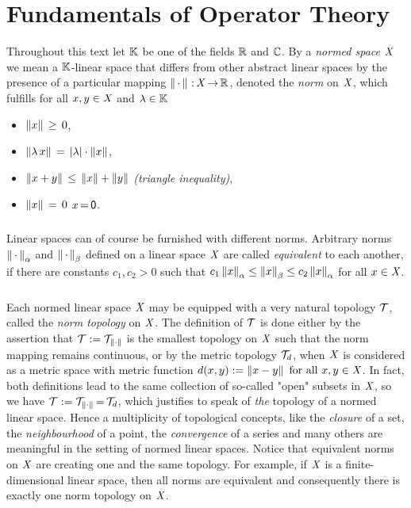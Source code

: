 \documentclass[11pt,twoside]{article}
\begin{document}
\section{Fundamentals of Operator Theory}                                      %
Throughout this text let ${\mathbb{K}}$ be one of the fields ${\mathbb{R}}$ and ${\mathbb{C}}$.
By a \textit{normed space} $\mathit{X}$ we mean a ${\mathbb{K}}$-linear space
that differs from other abstract linear spaces
by the presence of a particular mapping $\left\lVert \,\cdot\, \right\rVert{\,:\,} \mathit{X} {\,\to\,} {\mathbb{R}}$,
denoted the \textit{norm} on $\mathit{X}$,
which fulfills for all $x,y \in \mathit{X}$ and $\lambda \in {\mathbb{K}}$

\begin{itemize}[leftmargin=22mm,itemsep=2pt]
\item[(N-1)]
$\left\lVert x \right\rVert \, \geq \, 0$,

\item[(N-2)]
$\norm{\lambda \, x} \= \abs{\lambda} \cdot \norm{x}$,

\item[(N-3)]
$\left\lVert x+y \right\rVert \, \leq \, \left\lVert x \right\rVert + \left\lVert y \right\rVert$
\; \textit{(triangle inequality)},

\item[(N-4)]
$\left\lVert x \right\rVert \,=\, 0$ \iff $x {\,=\,} {\mathsf{0}}$.
\end{itemize}

\subparagraph{}
Linear spaces can of course be furnished with different norms.
Arbitrary norms $\left\lVert \,\cdot\, \right\rVert_{\alpha}$ and $\left\lVert \,\cdot\, \right\rVert_{\beta}$
defined on a linear space $\mathit{X}$
are called \textit{equivalent} to each another,
if there are constants $c_1,c_2 > 0$ such that
$
c_1 \left\lVert x \right\rVert_{\alpha} \leq
    \left\lVert x \right\rVert_{\beta}  \leq 
c_2 \left\lVert x \right\rVert_{\alpha}$
for all $x \in \mathit{X}$.

\subparagraph{}
Each normed linear space $\mathit{X}$ may be equipped
with a very natural topology $\mathcal{T}$,
called the \textit{norm topology} on $\mathit{X}$.
The definition of $\mathcal{T}$ is done either by the assertion
that $\mathcal{T} := \mathcal{T}_{\left\lVert \cdot \right\rVert}$ is the smallest topology on $\mathit{X}$
such that the norm mapping remains continuous,
or by the metric topology $\mathcal{T}_d$,
when $\mathit{X}$ is considered as a metric space with metric function
$d(x,y) := \left\lVert x-y \right\rVert \mbox{ for all } x,y \in \mathit{X}$.
In fact,
both definitions lead to the same collection of so-called
"open" subsets in $\mathit{X}$,
so we have $\mathcal{T} := \mathcal{T}_{\left\lVert \cdot \right\rVert} {\,=\,} \mathcal{T}_d$,
which justifies to speak of \textit{the} topology of a normed linear space.
Hence a multiplicity of topological concepts,
like the \textit{closure} of a set,
the \textit{neighbourhood} of a point,
the \textit{convergence} of a series and many others are meaningful
in the setting of normed linear spaces.
Notice
that equivalent norms on $\mathit{X}$ are creating one and the same topology.
For example,
if $\mathit{X}$ is a finite-dimensional linear space,
then all norms are equivalent
and consequently there is exactly one norm topology on $\mathit{X}$.
\end{document}
